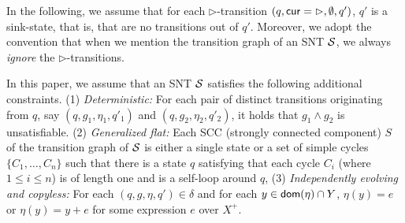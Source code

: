 In the following, we assume that for each $\triangleright$-transition $(q, \mathsf{cur} = \rhd, \emptyset, q')$, $q'$ is a sink-state, that is, that are no transitions out of $q'$. Moreover, we adopt the convention that when we mention the transition graph of an SNT ${\mathcal{S} }$, we always \emph{ignore} the $\triangleright$-transitions. 

In this paper, we assume that an SNT ${\mathcal{S} }$ satisfies the following additional constraints. (1) \emph{Deterministic:} For each pair of distinct transitions originating from $q$, say $(q, g_1, \eta_1,q'_1)$ and $(q, g_2,\eta_2,q'_2)$, it holds that $g_1 \wedge g_2$ is unsatisfiable. (2) \emph{Generalized flat:} Each SCC (strongly connected component) $S$ of the transition graph of ${\mathcal{S} }$ is either a single state or a set of simple cycles $\{C_1,\dots, C_n\}$ such that there is a state $q$ satisfying that each cycle $C_i$ (where $1 \le i \le n$) is of length one and is a self-loop around $q$,
%
(3) \emph{Independently evolving and copyless:} For each $(q, g, \eta, q') \in \delta$ and for each $y \in \mathsf{dom}(\eta) \cap Y$, $\eta(y)=e$ or $\eta(y)=y+e$ for some expression $e$ over $X^+$.


